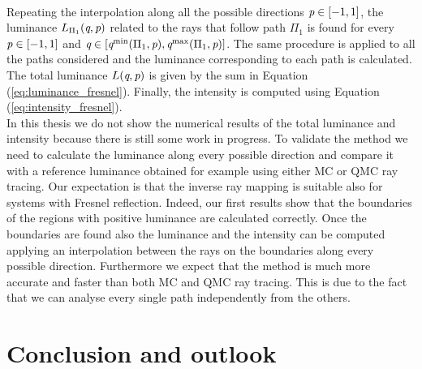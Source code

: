 \\\indent 
Repeating the interpolation along all the possible directions $\textit{p}\in[-1,1]$, the luminance $L_{\Pi_1}(\textit{q}, \textit{p})$ related to the rays that follow path $\Pi_1$ is found for every $\textit{p}\in[-1,1]$ and $\textit{q}\in[\textit{q}^{\textrm{min}}(\Pi_1,\textit{p}), \textit{q}^{\textrm{max}}(\Pi_1,\textit{p})]$. The same procedure is applied to all the paths considered and the luminance corresponding to each path is calculated. The total luminance $L(\textit{q}, \textit{p})$ is given by the sum in Equation (\ref{eq:luminance_fresnel}). Finally, the intensity is computed using Equation (\ref{eq:intensity_fresnel}). \\ \indent
In this thesis we do not show the numerical results of the total luminance and intensity because there is still some work in progress. To validate the method we need to calculate the luminance along every possible direction and compare it with a reference luminance obtained for example using either MC or QMC ray tracing. Our expectation is that the inverse ray mapping is suitable also for systems with Fresnel reflection. Indeed, our first results show that the boundaries of the regions with positive luminance are calculated correctly. Once the boundaries are found also the luminance and the intensity can be computed applying an interpolation between the rays on the boundaries along every possible direction. Furthermore we expect that the method is much more accurate and faster than both MC and QMC ray tracing. This is due to the fact that we can analyse every single path independently from the others.  
\section{Conclusion and outlook}